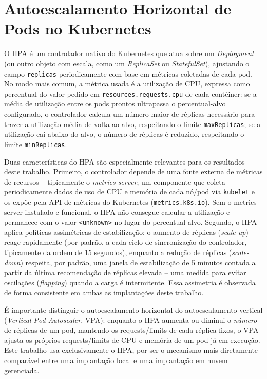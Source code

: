 \documentclass[12pt]{article}
\begin{document}
\section{Autoescalamento Horizontal de Pods no Kubernetes}

O HPA é um controlador nativo do Kubernetes que atua sobre um
\emph{Deployment} (ou outro objeto com escala, como um \emph{ReplicaSet} ou
\emph{StatefulSet}), ajustando o campo \texttt{replicas} periodicamente com
base em métricas coletadas de cada pod. No modo mais comum, a métrica usada
é a utilização de CPU, expressa como percentual do valor pedido em
\texttt{resources.requests.cpu} de cada contêiner: se a média de utilização
entre os pods prontos ultrapassa o percentual-alvo configurado, o
controlador calcula um número maior de réplicas necessário para trazer a
utilização média de volta ao alvo, respeitando o limite \texttt{maxReplicas};
se a utilização cai abaixo do alvo, o número de réplicas é reduzido,
respeitando o limite \texttt{minReplicas}.

Duas características do HPA são especialmente relevantes para os resultados
deste trabalho. Primeiro, o controlador depende de uma fonte externa de
métricas de recursos -- tipicamente o \emph{metrics-server}, um componente
que coleta periodicamente dados de uso de CPU e memória de cada nó/pod via
\texttt{kubelet} e os expõe pela API de métricas do Kubernetes
(\texttt{metrics.k8s.io}). Sem o metrics-server instalado e funcional, o HPA
não consegue calcular a utilização e permanece com o valor \texttt{<unknown>}
no lugar do percentual-alvo. Segundo, o HPA aplica políticas assimétricas de
estabilização: o aumento de réplicas (\emph{scale-up}) reage rapidamente
(por padrão, a cada ciclo de sincronização do controlador, tipicamente da
ordem de 15 segundos), enquanto a redução de réplicas (\emph{scale-down})
respeita, por padrão, uma janela de estabilização de 5 minutos contada a
partir da última recomendação de réplicas elevada -- uma medida para evitar
oscilações (\emph{flapping}) quando a carga é intermitente. Essa assimetria
é observada de forma consistente em ambas as implantações deste trabalho.

É importante distinguir o autoescalamento horizontal do autoescalamento
vertical (\emph{Vertical Pod Autoscaler}, VPA): enquanto o HPA aumenta ou
diminui o \emph{número} de réplicas de um pod, mantendo os requests/limits
de cada réplica fixos, o VPA ajusta os próprios requests/limits de CPU e
memória de um pod já em execução. Este trabalho usa exclusivamente o HPA,
por ser o mecanismo mais diretamente comparável entre uma implantação local
e uma implantação em nuvem gerenciada.
\end{document}
